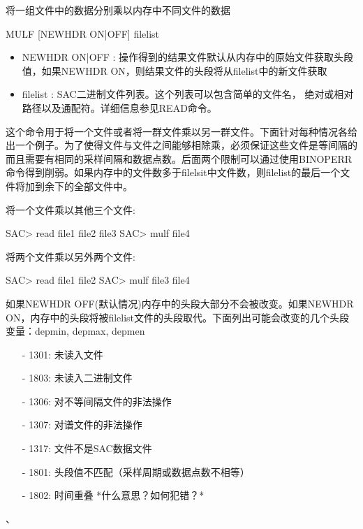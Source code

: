 \label{cmd:mulf}

将一组文件中的数据分别乘以内存中不同文件的数据

\begin{SACSTX}
MULF [NEWHDR ON|OFF] filelist
\end{SACSTX}

\begin{itemize}
\item NEWHDR ON|OFF : 操作得到的结果文件默认从内存中的原始文件获取头段值，如果NEWHDR ON，则结果文件的头段将从filelist中的新文件获取 
\item filelist : SAC二进制文件列表。这个列表可以包含简单的文件名， 绝对或相对路径以及通配符。详细信息参见READ命令。
\end{itemize}

这个命令用于将一个文件或者将一群文件乘以另一群文件。下面针对每种情况各给出一个例子。为了使得文件与文件之间能够相除乘，必须保证这些文件是等间隔的而且需要有相同的采样间隔和数据点数。后面两个限制可以通过使用BINOPERR命令得到削弱。如果内存中的文件数多于filelsit中文件数，则filelist的最后一个文件将加到余下的全部文件中。

将一个文件乘以其他三个文件:
\begin{SACCode}
SAC> read file1 file2 file3
SAC> mulf file4
\end{SACCode}

将两个文件乘以另外两个文件:
\begin{SACCode}
SAC> read file1 file2
SAC> mulf file3 file4
\end{SACCode}

如果NEWHDR OFF(默认情况)内存中的头段大部分不会被改变。如果NEWHDR ON，内存中的头段将被filelist文件的头段取代。下面列出可能会改变的几个头段变量：depmin, depmax, depmen

\begin{itemize}
\item[-]1301: 未读入文件
\item[-]1803: 未读入二进制文件
\item[-]1306: 对不等间隔文件的非法操作
\item[-]1307: 对谱文件的非法操作
\item[-]1317: 文件不是SAC数据文件
\item[-]1801: 头段值不匹配（采样周期或数据点数不相等）
\end{itemize}

\begin{itemize}
\item[-]1802: 时间重叠  *什么意思？如何犯错？*
\end{itemize}

、
